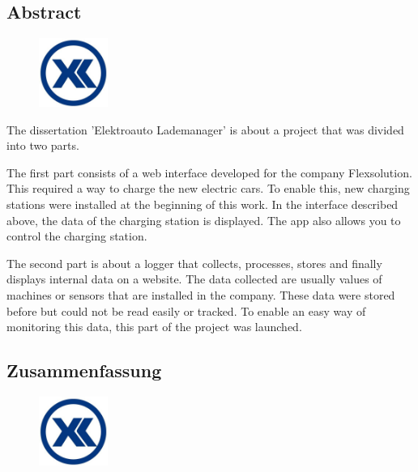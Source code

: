 \begin{spacing}{1}
    \chapter*{Abstract}
\end{spacing}
\begin{figure}
    \begin{center}
      \includegraphics[width=0.2\textwidth]{pics/Firmenlogo.jpeg}
    \end{center}
\end{figure}
The dissertation 'Elektroauto Lademanager' is about a project that was divided into two parts.

The first part consists of a web interface developed for the company Flexsolution. This required a way to charge the new electric cars. To enable this, new charging stations were installed at the beginning of this work. In the interface described above, the data of the charging station is displayed. The app also allows you to control the charging station.

The second part is about a logger that collects, processes, stores and finally displays internal data on a website. The data collected are usually values of machines or sensors that are installed in the company. These data were stored before but could not be read easily or tracked. To enable an easy way of monitoring this data, this part of the project was launched.
\newpage
\begin{spacing}{1}
    \chapter*{Zusammenfassung}
\end{spacing}
\begin{figure}
    \begin{center}
      \includegraphics[width=0.2\textwidth]{pics/Firmenlogo.jpeg}
    \end{center}
\end{figure}

